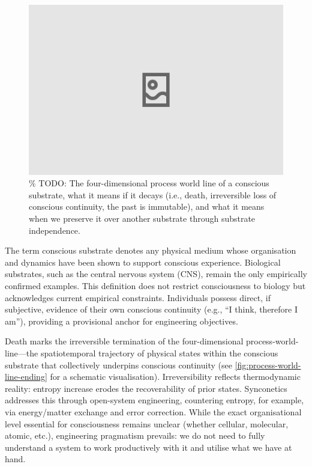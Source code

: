 \documentclass[10pt]{article}
\begin{document}
\begin{sloppypar}
  \begin{figure}[ht!]
    \centering
    \includegraphics[width=\textwidth]{figures/4D-process-world-line-ending.png}
    \caption{\% TODO: The four-dimensional process world line of a conscious substrate, what it means if it decays (i.e., death, irreversible loss of conscious continuity, the past is immutable), and what it means when we preserve it over another substrate through substrate independence.}
    \label{fig:process-world-line-ending}
  \end{figure}

  The term conscious substrate denotes any physical medium whose organisation and dynamics have been shown to support conscious experience. Biological substrates, such as the central nervous system (CNS), remain the only empirically confirmed examples. This definition does not restrict consciousness to biology but acknowledges current empirical constraints. Individuals possess direct, if subjective, evidence of their own conscious continuity (e.g., “I think, therefore I am”), providing a provisional anchor for engineering objectives.

  Death marks the irreversible termination of the four-dimensional process-world-line—the spatiotemporal trajectory of physical states within the conscious substrate that collectively underpins conscious continuity (see \autoref{fig:process-world-line-ending} for a schematic visualisation). Irreversibility reflects thermodynamic reality: entropy increase erodes the recoverability of prior states. Synconetics addresses this through open-system engineering, countering entropy, for example, via energy/matter exchange and error correction. While the exact organisational level essential for consciousness remains unclear (whether cellular, molecular, atomic, etc.), engineering pragmatism prevails: we do not need to fully understand a system to work productively with it and utilise what we have at hand.


\end{sloppypar}
\end{document}
